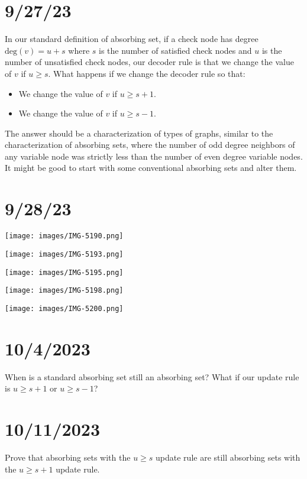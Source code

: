 \documentclass{article}
\begin{document}
\section*{9/27/23}

In our standard definition of absorbing set, if a check node has degree $\text{deg}(v) = u + s$ where $s$ is the number of satisfied check nodes and $u$ is the number of unsatisfied check nodes, our decoder rule is that we change the value of $v$ if $u \geq s$. What happens if we change the decoder rule so that:
\begin{itemize}
    \item We change the value of $v$ if $u \geq s + 1$.
    \item We change the value of $v$ if $u \geq s - 1$.
\end{itemize}
The answer should be a characterization of types of graphs, similar to the characterization of absorbing sets, where the number of odd degree neighbors of any variable node was strictly less than the number of even degree variable nodes. It might be good to start with some conventional absorbing sets and alter them.

\section{9/28/23}

\texttt{[image: images/IMG-5190.png]}

\texttt{[image: images/IMG-5193.png]}

\texttt{[image: images/IMG-5195.png]}

\texttt{[image: images/IMG-5198.png]}

\texttt{[image: images/IMG-5200.png]}


\section*{10/4/2023}

When is a standard absorbing set still an absorbing set? What if our update rule is $u \geq s + 1$ or $u \geq s - 1$?

\section*{10/11/2023}

Prove that absorbing sets with the $u \geq s$ update rule are still absorbing sets with the $u \geq s + 1$ update rule.
\end{document}
